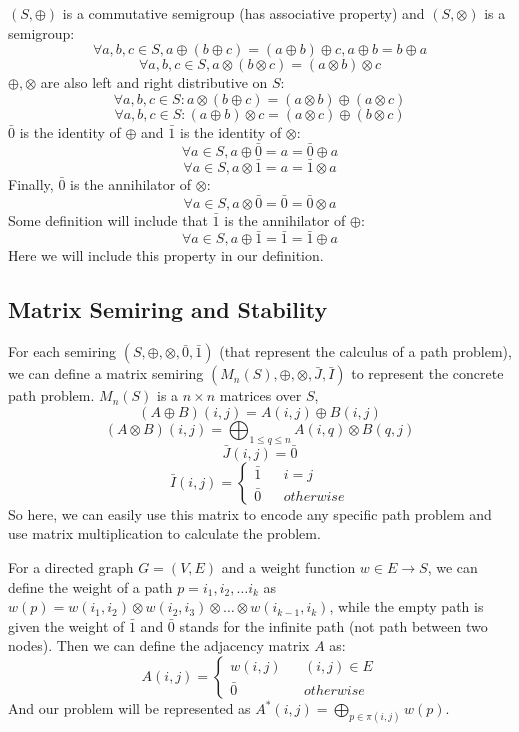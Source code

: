 \documentclass[a4paper,12pt,twoside,openright]{report}
\begin{document}
$(S,\oplus)$ is a commutative semigroup (has associative property) and $(S,\otimes)$ is a semigroup:
\[
\forall a,b,c \in S, a \oplus (b\oplus c) = (a \oplus b) \oplus c,a \oplus b = b \oplus a
\]
\[
\forall a,b,c \in S, a \otimes (b\otimes c) = (a \otimes b) \otimes c
\]
$\oplus,\otimes$ are also left and right distributive on $S$: 
\[
\forall a,b,c \in S: a \otimes(b \oplus c) = (a \otimes b) \oplus (a \otimes c)
\]
\[
\forall a,b,c \in S:(a \oplus b) \otimes c  = (a \otimes c) \oplus (b \otimes c)
\] 
$\bar0$ is the identity of $\oplus$ and  $\bar1$ is the identity of $\otimes$: 
\[\forall a \in S, a \oplus \bar{0} = a = \bar{0} \oplus a\]
\[\forall a \in S, a \otimes \bar{1} = a = \bar{1} \otimes a\]
Finally, $\bar0$ is the  annihilator of $\otimes$: 
\[\forall a \in S, a \otimes \bar{0} = \bar{0} = \bar{0} \otimes a\]
Some definition will include that $\bar1$ is the annihilator of $\oplus$:
\[\forall a \in S, a \oplus \bar{1} = \bar{1} = \bar{1} \oplus a\]
Here we will include this property in our definition.
\subsection{Matrix Semiring and Stability}
For each semiring $(S,\oplus,\otimes,\bar0,\bar1)$ (that represent the calculus of a path problem), we can define a matrix semiring $(M_n(S),\oplus,\otimes,\bar{J},\bar{I})$ to represent the concrete path problem. $M_n(S)$ is a $n\times n$ matrices over $S$,
\[(A \oplus B)(i,j) = A(i,j)\oplus B(i,j)\]
\[(A \otimes B)(i,j) = \bigoplus_{1\leq q \leq n}A(i,q)\otimes B(q,j)\]
\[\bar{J}(i,j) = \bar0\]
\[\bar{I}(i,j)=\left\{
\begin{array}{rcl}
\bar1       &      & {i = j}\\
\bar0     &      & {otherwise}
\end{array} \right.\]
So here, we can easily use this matrix to encode any specific path problem and use matrix multiplication to calculate the problem. 

For a directed graph $G = (V,E)$ and a weight function $w \in E \rightarrow S$, 
we can define the weight of a path $p = i_1,i_2, \dots i_k$ as $w(p) = w (i_1,i_2) \otimes w(i_2,i_3)\otimes \dots \otimes w(i_{k-1},i_k)$, while the empty path is given the weight of $\bar1$ and $\bar0$ stands for the infinite path (not path between two nodes).
Then we can define the adjacency matrix $A$ as: 
\[A(i,j)=\left\{
\begin{array}{rcl}
w(i,j)      &      & {(i,j)\in E}\\
\bar0     &      & {otherwise}
\end{array} \right.\]
And our problem will be represented as $A^*(i,j) = \bigoplus_{p \in \pi (i,j)}w(p)$.
\end{document}
